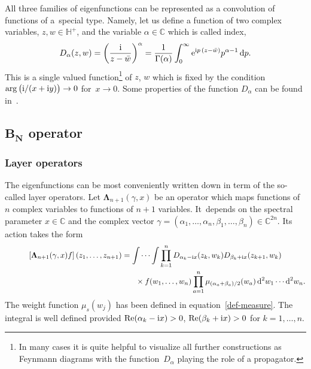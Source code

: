 All three families of eigenfunctions can be represented as a convolution of functions of a~special type. Namely, let us define a
function of two complex variables, $z,w\in \mathbb H^+$, and the variable $\alpha\in \mathbb C$ which is called index,
\begin{gather*}%
 D_{\alpha}(z, w)=\bigg(\frac{\rm i}{z-\bar w}\bigg)^\alpha=\frac{1}{\Gamma(\alpha)}
 \int_0^{\infty} {\rm e}^{{\rm i}p\,(z-\bar w)} p^{\alpha-1} \, {\rm d}p.
\end{gather*}
This is a single valued function\footnote{In many cases it is quite helpful to
visualize all further constructions as Feynmann diagrams with the func\-tion~$D_\alpha$ playing the role of a propagator.} of $z$, $w$ which is
fixed by the condition $\arg\big({\rm i}/(x+{\rm i}y)\big)\to 0$ for~$x\to 0$. Some properties of the function $D_\alpha$ can be found in~\cite{DMspinchainandSL2RGustafson}.

\subsection[BN operator]{$\boldsymbol{B_N}$ operator}%

\subsubsection{Layer operators}

The eigenfunctions can be most conveniently written down in term of the so-called layer ope\-ra\-tors. Let $\boldsymbol\Lambda_{n+1}(\gamma,x)$
be an operator which maps functions of $n$ complex variables to functions of $n+1$ variables. It~depends on the spectral parameter
$x\in\mathbb C$ and the complex vector $\gamma=(\alpha_1,\dots,\alpha_{n}, \beta_1,\dots,\beta_n) \in \mathbb{C}^{2n}$. Its action takes
the form
\begin{gather*}%
\left[\boldsymbol\Lambda_{n+1}(\gamma,x) f\right](z_1,\dots,z_{n+1}) =
\idotsint \prod_{k=1}^{n} D_{\alpha_k-{\rm i}x}(z_k,w_k) D_{\beta_{k}+{\rm i}x}(z_{k+1},w_k)\notag
\\ \hphantom{\left[\boldsymbol\Lambda_{n+1}(\gamma,x) f\right](z_1,\dots,z_{n+1}) =\idotsint}
{}\times f(w_1,\dots,w_{n})\prod_{a=1}^n
\mu_{{(\alpha_a+\beta_{a})}/2}(w_a)
\,{\rm d}^2w_1\cdots {\rm d}^2w_n.
\end{gather*}
The weight function $\mu_{s}(w_j)$ has been defined in equation~\eqref{def-measure}. The integral is well defined provided
$\mathop{\rm Re}(\alpha_k-{\rm i}x)>0$, $\mathop{\rm Re}(\beta_{k}+{\rm i}x)>0$ for $k=1,\dots,n$.

